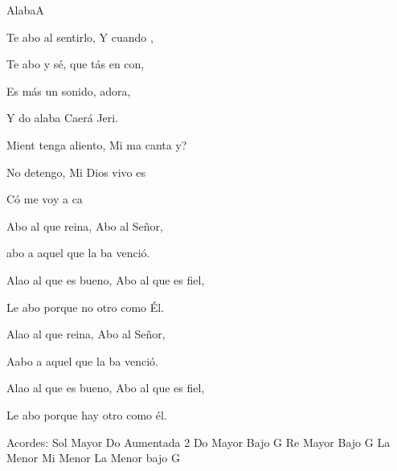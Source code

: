 \documentclass[12pt, spanish]{book}
\begin{document}
\begin{song}{Alaba}{A}
\begin{SBExtraKeys}
{            \begin{SBOpGroup}
                Te abo al sentirlo, Y  cuando ,

                Te abo y sé, que tás en con,

                Es más  un sonido,  adora,

                Y do alaba Caerá Jeri.

                Mient tenga aliento, Mi ma canta y?
            \end{SBOpGroup}

            \begin{SBOpGroup}
                No  detengo, Mi Dios vivo es

                Có me voy a ca
            \end{SBOpGroup}

            \begin{SBOpGroup}
                Abo al que reina, Abo al Señor,

                abo a aquel que la ba venció.

                Alao al que es bueno, Abo al que es fiel,

                Le abo porque no  otro como Él.

                Alao al que reina, Abo al Señor,

                Aabo a aquel que la ba venció.

                Alao al que es bueno, Abo al que es fiel,

                Le abo porque  hay otro como él.
            \end{SBOpGroup}

            \ifChordBk
            \begin{SBOpGroup}
                Acordes:
                \upchord{\G}\qquad Sol Mayor \hfill
                \upchord{\Ctwo}\qquad Do Aumentada 2 \hfill\null\break
                \upchord{\CG}\qquad Do Mayor Bajo G \hfill
                \upchord{\DG}\qquad Re Mayor Bajo G \hfill\null\break
                \upchord{\Am}\qquad La Menor \hfill
                \upchord{\Em}\qquad Mi Menor \hfill\null\break
                \upchord{\AmG}\qquad La Menor bajo G \hfill
            \end{SBOpGroup}
            \fi
        }\end{SBExtraKeys}
    \end{song}
\end{document}
